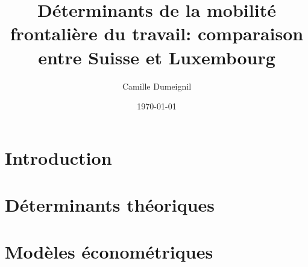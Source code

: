 \documentclass{article}
\title{Déterminants de la mobilité frontalière du travail: comparaison entre Suisse et Luxembourg}
\author{Camille Dumeignil}
\date{\today}
\begin{document}
\maketitle
\tableofcontents %

\section{Introduction}
\section{Déterminants théoriques}
\section{Modèles économétriques}
\end{document}
